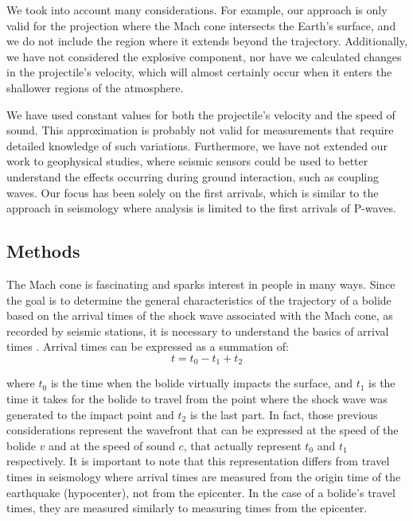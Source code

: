 \documentclass[linenum]{SSA-SRL}
\begin{document}
We took into account many considerations. For example, our approach is only valid for the projection where the Mach cone intersects the Earth’s surface, and we do not include the region where it extends beyond the trajectory. Additionally, we have not considered the explosive component, nor have we calculated changes in the projectile’s velocity, which will almost certainly occur when it enters the shallower regions of the atmosphere.

We have used constant values for both the projectile’s velocity and the speed of sound. This approximation is probably not valid for measurements that require detailed knowledge of such variations. Furthermore, we have not extended our work to geophysical studies, where seismic sensors could be used to better understand the effects occurring during ground interaction, such as coupling waves. Our focus has been solely on the first arrivals, which is similar to the approach in seismology where analysis is limited to the first arrivals of P-waves.

\subsection{\textbf{Methods}}
The Mach cone is fascinating and sparks interest in people in many ways. Since the goal is to determine the general characteristics of the trajectory of a bolide based on the arrival times of the shock wave associated with the Mach cone, as recorded by seismic stations, it is necessary to understand the basics of arrival times \citep{Pujol_2005}. Arrival times can be expressed as a summation of:
\begin{equation}
t = t_0 - t_1 + t_2
\label{eq:time_calculation}
\end{equation}

where \( t_0 \) is the time when the bolide virtually impacts the surface, and \( t_1 \) is the time it takes for the bolide to travel from the point where the shock wave was generated to the impact point and \( t_2 \) is the last part. In fact, those previous considerations represent the wavefront that can be expressed at the speed of the bolide \( v \) and at the speed of sound \( c \), that actually represent \( t_0 \) and \( t_1 \) respectively. It is important to note that this representation differs from travel times in seismology where arrival times are measured from the origin time of the earthquake (hypocenter), not from the epicenter. In the case of a bolide's travel times, they are measured similarly to measuring times from the epicenter. 
\end{document}
